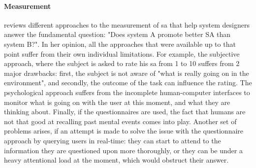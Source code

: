 \paragraph{Measurement}
\cite[p.~791-792]{endsley_situation_1988} reviews different approaches to the measurement of \gls{sa} that help system designers answer the fundamental question: "Does system A promote better SA than system B?". In her opinion, all the approaches that were available up to that point suffer from their own individual limitations. For example, the subjective approach, where the subject is asked to rate his \gls{sa} from 1 to 10 suffers from 2 major drawbacks: first, the subject is not aware of "what is really going on in the environment", and secondly, the outcome of the task can influence the rating. The psychological approach suffers from the incomplete human-computer interfaces to monitor what is going on with the user at this moment, and what they are thinking about. Finally, if the questionnaires are used, the fact that humans are not that good at recalling past mental events comes into play. Another set of problems arises, if an attempt is made to solve the issue with the questionnaire approach by querying users in real-time: they can start to attend to the information they are questioned upon more thoroughly, or they can be under a heavy attentional load at the moment, which would obstruct their answer.

